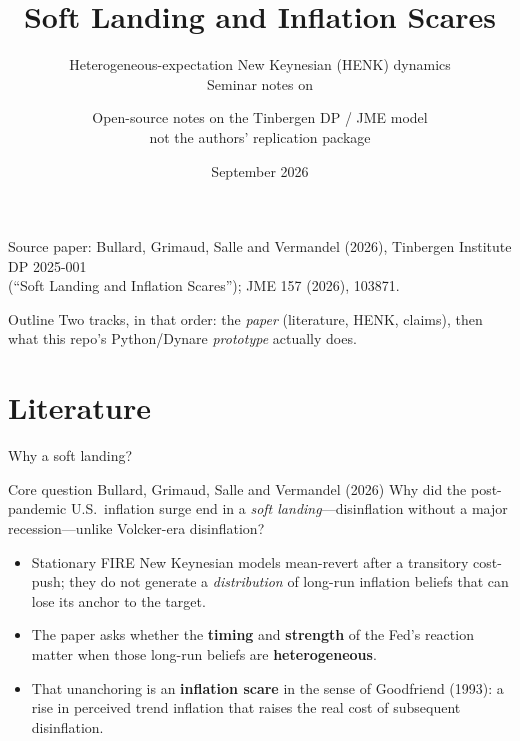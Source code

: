 \documentclass[11pt,aspectratio=169]{beamer}
\title[Soft landing \& inflation scares]{Soft Landing and Inflation Scares}
\subtitle{\texorpdfstring{Heterogeneous-expectation New Keynesian (HENK) dynamics\\
{\normalsize Seminar notes on \paper}}{HENK seminar notes}}
\author[Prototype slides]{\texorpdfstring{Open-source notes on the Tinbergen DP / JME model\\
{\small not the authors' replication package}}{Open-source prototype slides (not the authors' package)}}
\institute[MacroModellerBot]{\texttt{bullard-soft-landing/} in MacroModellerBot}
\date{September 2026}
\newcommand{\paper}{Bullard, Grimaud, Salle and Vermandel (2026)}
\begin{document}
\begin{frame}[plain]
  \titlepage
  \vspace{-1.2em}
  \begin{center}
    {\footnotesize
    Source paper: \paper, Tinbergen Institute DP 2025-001\\
    (``Soft Landing and Inflation Scares''); JME 157 (2026), 103871.}
  \end{center}
\end{frame}

\begin{frame}{Outline}
  \tableofcontents
  \vspace{0.8em}
  {\footnotesize Two tracks, in that order: the \emph{paper} (literature, HENK,
  claims), then what this repo's Python/Dynare \emph{prototype} actually does.}
\end{frame}

\section{Literature}
\begin{frame}{Why a soft landing?}
  \begin{block}{Core question \paper}
    Why did the post-pandemic U.S.\ inflation surge end in a
    \emph{soft landing}---disinflation without a major recession---unlike
    Volcker-era disinflation?
  \end{block}
  \begin{itemize}
    \item Stationary FIRE New Keynesian models mean-revert after a transitory
          cost-push; they do not generate a \emph{distribution} of long-run
          inflation beliefs that can lose its anchor to the target.
    \item The paper asks whether the \textbf{timing} and \textbf{strength}
          of the Fed's reaction matter when those long-run beliefs are
          \textbf{heterogeneous}.
    \item That unanchoring is an \textbf{inflation scare} in the sense of
          Goodfriend (1993): a rise in perceived trend inflation that
          raises the real cost of subsequent disinflation.
  \end{itemize}
\end{frame}
\end{document}
